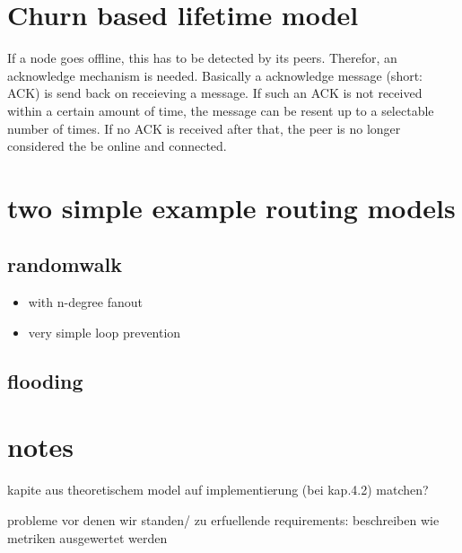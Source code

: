 \section{Churn based lifetime model}
If a node goes offline, this has to be detected by its peers. Therefor, an acknowledge mechanism is needed. Basically a acknowledge message (short: ACK) is send back on receieving a message. If such an ACK is not received within a certain amount of time, the message can be resent up to a selectable number of times. If no ACK is received after that, the peer is no longer considered the be online and connected.



\section{two simple example routing models}


\subsection{randomwalk}
\begin{itemize}
\item            with n-degree fanout
\item            very simple loop prevention
\end{itemize}
\subsection{flooding}

\section{notes}
kapite aus theoretischem model auf implementierung (bei kap.4.2) matchen?

probleme vor denen wir standen/ zu erfuellende requirements: beschreiben wie metriken ausgewertet werden
